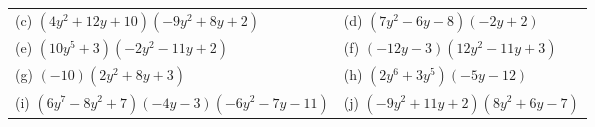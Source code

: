 \begin{enumerate}[noitemsep, label=\textbf{\arabic*}. ]
{\begin{center}
\begin{xtabular*}{\mytablewidth}[t]{|p{10\mystarwidth}|p{10\mystarwidth}|}
        (c) $\left(4{y}^{2}+12y+10\right)\left(-9{y}^{2}+8y+2\right)$ &
        (d) $\left(7{y}^{2}-6y-8\right)\left(-2y+2\right)$%
     \tabularnewline{}
        (e) $\left(10{y}^{5}+3\right)\left(-2{y}^{2}-11y+2\right)$ &
        (f) $\left(-12y-3\right)\left(12{y}^{2}-11y+3\right)$%
     \tabularnewline{}
        (g) $\left(-10\right)\left(2{y}^{2}+8y+3\right)$ &
        (h) $\left(2{y}^{6}+3{y}^{5}\right)\left(-5y-12\right)$%
     \tabularnewline{}
        (i) $\left(6{y}^{7}-8{y}^{2}+7\right)\left(-4y-3\right)\left(-6{y}^{2}-7y-11\right)$ &
        (j) $\left(-9{y}^{2}+11y+2\right)\left(8{y}^{2}+6y-7\right)$%
     \tabularnewline{}

\end{xtabular*}
\end{center}}
\end{enumerate}
